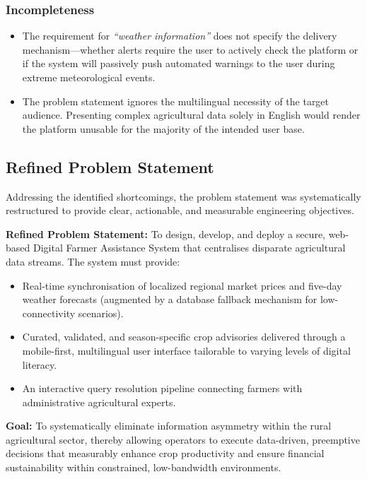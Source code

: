\subsubsection*{Incompleteness}
\begin{itemize}
    \item The requirement for \textit{``weather information''} does not specify the delivery mechanism—whether alerts require the user to actively check the platform or if the system will passively push automated warnings to the user during extreme meteorological events.
    \item The problem statement ignores the multilingual necessity of the target audience. Presenting complex agricultural data solely in English would render the platform unusable for the majority of the intended user base.
\end{itemize}

\subsection{Refined Problem Statement}
Addressing the identified shortcomings, the problem statement was systematically restructured to provide clear, actionable, and measurable engineering objectives.

\textbf{Refined Problem Statement:} To design, develop, and deploy a secure, web-based Digital Farmer Assistance System that centralises disparate agricultural data streams. The system must provide:
\begin{itemize}
    \item Real-time synchronisation of localized regional market prices and five-day weather forecasts (augmented by a database fallback mechanism for low-connectivity scenarios).
    \item Curated, validated, and season-specific crop advisories delivered through a mobile-first, multilingual user interface tailorable to varying levels of digital literacy.
    \item An interactive query resolution pipeline connecting farmers with administrative agricultural experts.
\end{itemize}

\textbf{Goal:} To systematically eliminate information asymmetry within the rural agricultural sector, thereby allowing operators to execute data-driven, preemptive decisions that measurably enhance crop productivity and ensure financial sustainability within constrained, low-bandwidth environments.

